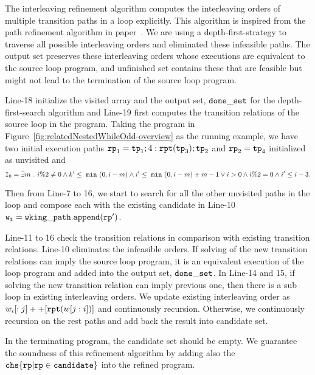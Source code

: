 The interleaving refinement algorithm computes the interleaving orders of multiple transition paths in a loop explicitly.
This algorithm is inspired from the path refinement algorithm in paper~\cite{GulwaniJK09}. 
We are using a depth-first-strategy to traverse all possible interleaving orders and eliminated these infeasible paths. The output set 
preserves these interleaving orders whose executions are equivalent to the source loop program, and unfinished
set contains these that are feasible but might not lead to the termination of the source loop program.

Line-18 initialize the visited array and the output set, $\mathtt{done\_set}$ for the depth-first-search algorithm and Line-19 first computes the transition relations of the source loop in the program.
Taking the program in Figure~\ref{fig:relatedNestedWhileOdd-overview} as the running example,
we have two initial execution paths $\mathtt{rp}_1 = \mathtt{tp}_1; 4:\mathtt{rpt}(\mathtt{tp}_3);\mathtt{tp}_2$ and $\mathtt{rp}_2 =\mathtt{tp}_4$ initialized as unvisited
and 
\[
   \mathtt{I_0} = \exists m ~.~ i \%2 \neq 0 \land k' \leq ~\mathtt{min}~(0, i - m) 
   \land i' \leq ~\mathtt{min}~(0, i - m) + m - 1 \lor  i > 0 \land i \%2 = 0 \land  i' \leq i - 3.
\]

Then from Line-7 to 16, we start to search for all the other unvisited paths  in the loop
and compose each with the existing candidate in Line-10 $\mathtt{w_i = wking\_path.append(\mathtt{rp}')}$.

Line-11 to 16 check the transition relations in comparison with existing transition relations.
Line-10 eliminates the infeasible orders.
If solving of the new transition relations can imply the source loop program,
it is an equivalent execution of the loop program and added into the output set, $\mathtt{done\_set}$.
In Line-14 and 15, if solving the new transition relation can imply previous one, then there is a sub loop
in existing interleaving orders. We update existing interleaving order
as $w_i[:j]++[\mathtt{rpt}(w[j:i])]$ and continuously recursion.
Otherwise, we continuously recursion on the rest paths and add back the result into candidate set.

In the terminating program, the candidate set should be empty. We guarantee the soundness of this refinement algorithm
by adding also the $\rpchoose{ \rprog \vert \rprog \in \kw{candidate}}$ into the refined program.


